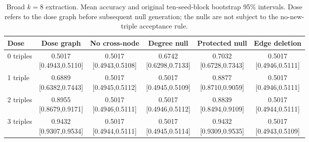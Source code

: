 \begin{table}[H]\centering
\caption{Broad $k=8$ extraction. Mean accuracy and original ten-seed-block bootstrap 95\% intervals. Dose refers to the dose graph before subsequent null generation; the nulls are not subject to the no-new-triple acceptance rule.}\label{tab:full-S1_broad}
\small\setlength{\tabcolsep}{4pt}
\begin{tabular}{lccccc}\toprule
Dose & Dose graph & No cross-node & Degree null & Protected null & Edge deletion \\ \midrule
0 triples & \shortstack{0.5017\\{}[0.4943,0.5110]} & \shortstack{0.5017\\{}[0.4943,0.5108]} & \shortstack{0.6742\\{}[0.6298,0.7133]} & \shortstack{0.7032\\{}[0.6728,0.7343]} & \shortstack{0.5017\\{}[0.4946,0.5111]} \\[3pt]
1 triple & \shortstack{0.6889\\{}[0.6382,0.7443]} & \shortstack{0.5017\\{}[0.4945,0.5112]} & \shortstack{0.5017\\{}[0.4945,0.5109]} & \shortstack{0.8877\\{}[0.8710,0.9059]} & \shortstack{0.5017\\{}[0.4946,0.5111]} \\[3pt]
2 triples & \shortstack{0.8955\\{}[0.8679,0.9171]} & \shortstack{0.5017\\{}[0.4946,0.5111]} & \shortstack{0.5017\\{}[0.4946,0.5112]} & \shortstack{0.8839\\{}[0.8494,0.9109]} & \shortstack{0.5017\\{}[0.4944,0.5111]} \\[3pt]
3 triples & \shortstack{0.9432\\{}[0.9307,0.9534]} & \shortstack{0.5017\\{}[0.4944,0.5111]} & \shortstack{0.5017\\{}[0.4945,0.5114]} & \shortstack{0.9432\\{}[0.9309,0.9535]} & \shortstack{0.5017\\{}[0.4943,0.5109]} \\[3pt]
\bottomrule\end{tabular}
\end{table}

